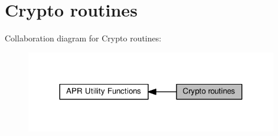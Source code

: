\hypertarget{group__APR__Util__Crypto}{}\section{Crypto routines}
\label{group__APR__Util__Crypto}
Collaboration diagram for Crypto routines\+:
\nopagebreak
\begin{figure}[H]
\begin{center}
\leavevmode
\includegraphics[width=311pt]{group__APR__Util__Crypto}
\end{center}
\end{figure}
